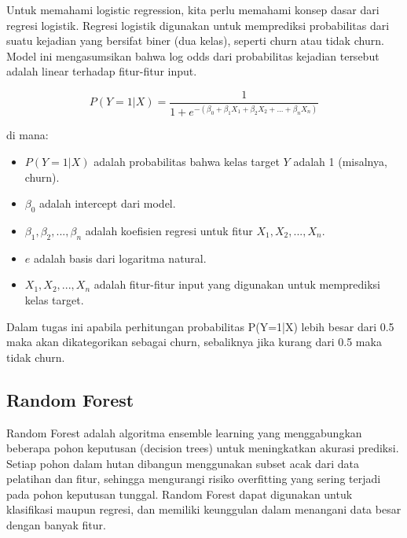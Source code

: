 \newpage
Untuk memahami logistic regression, kita perlu memahami konsep dasar dari regresi logistik. Regresi logistik digunakan untuk memprediksi probabilitas dari suatu kejadian yang bersifat biner (dua kelas), seperti churn atau tidak churn. Model ini mengasumsikan bahwa log odds dari probabilitas kejadian tersebut adalah linear terhadap fitur-fitur input.

\begin{equation}
    P(Y=1|X) = \frac{1}{1 + e^{-(\beta_0 + \beta_1 X_1 + \beta_2 X_2 + ... + \beta_n X_n)}}
\end{equation}

di mana:
\begin{itemize}
    \item \( P(Y=1|X) \) adalah probabilitas bahwa kelas target \( Y \) adalah 1 (misalnya, churn).
    \item \( \beta_0 \) adalah intercept dari model.
    \item \( \beta_1, \beta_2, ..., \beta_n \) adalah koefisien regresi untuk fitur \( X_1, X_2, ..., X_n \).
    \item \( e \) adalah basis dari logaritma natural.
    \item \( X_1, X_2, ..., X_n \) adalah fitur-fitur input yang digunakan untuk memprediksi kelas target.
\end{itemize}

Dalam tugas ini apabila perhitungan probabilitas P(Y=1|X) lebih besar dari 0.5 maka akan dikategorikan sebagai churn, sebaliknya jika kurang dari 0.5 maka tidak churn.

\subsection{Random Forest}
Random Forest adalah algoritma ensemble learning yang menggabungkan beberapa pohon keputusan (decision trees) untuk meningkatkan akurasi prediksi. Setiap pohon dalam hutan dibangun menggunakan subset acak dari data pelatihan dan fitur, sehingga mengurangi risiko overfitting yang sering terjadi pada pohon keputusan tunggal. Random Forest dapat digunakan untuk klasifikasi maupun regresi, dan memiliki keunggulan dalam menangani data besar dengan banyak fitur.

